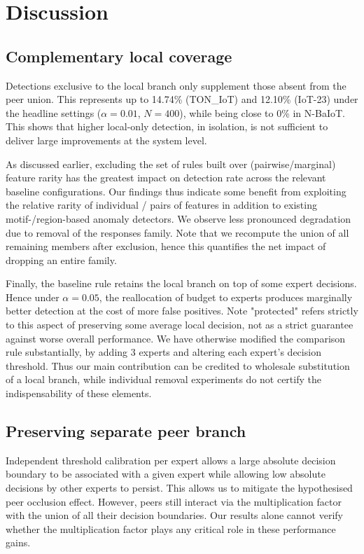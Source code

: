 \section{Discussion} 
\label{sec:discussion} 
\subsection{Complementary local coverage} 
Detections exclusive to the local branch only supplement those absent from the peer union. This represents up to 14.74\% (TON\_IoT) and 12.10\% (IoT-23) under the headline settings ($\alpha=0.01$, $N=400$), while being close to 0\% in N-BaIoT. This shows that higher local-only detection, in isolation, is not sufficient to deliver large improvements at the system level.

As discussed earlier, excluding the set of rules built over (pairwise/marginal) feature rarity has the greatest impact on detection rate across the relevant baseline configurations. Our findings thus indicate some benefit from exploiting the relative rarity of individual / pairs of features in addition to existing motif-/region-based anomaly detectors. We observe less pronounced degradation due to removal of the responses family. Note that we recompute the union of all remaining members after exclusion, hence this quantifies the net impact of dropping an entire family.

Finally, the baseline rule retains the local branch on top of some expert decisions. Hence under $\alpha=0.05$, the reallocation of budget to experts produces marginally better detection at the cost of more false positives. Note "protected" refers strictly to this aspect of preserving some average local decision, not as a strict guarantee against worse overall performance. We have otherwise modified the comparison rule substantially, by adding 3 experts and altering each expert's decision threshold. Thus our main contribution can be credited to wholesale substitution of a local branch, while individual removal experiments do not certify the indispensability of these elements.

\subsection{Preserving separate peer branch} 
Independent threshold calibration per expert allows a large absolute decision boundary to be associated with a given expert while allowing low absolute decisions by other experts to persist. This allows us to mitigate the hypothesised peer occlusion effect. However, peers still interact via the multiplication factor with the union of all their decision boundaries. Our results alone cannot verify whether the multiplication factor plays any critical role in these performance gains.

